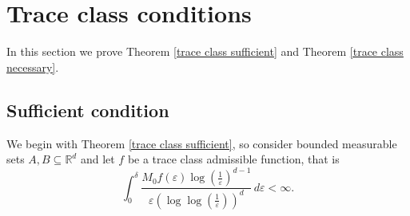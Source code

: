 \documentclass[12pt]{amsart}
\numberwithin{equation}{section}
\newcommand{\R}{\mathbb{R}}
\newcommand{\eps}{\varepsilon}
\begin{document}
\section{Trace class conditions}
In this section we prove Theorem \ref{trace class sufficient} and Theorem \ref{trace class necessary}. 

\subsection{Sufficient condition}
We begin with Theorem \ref{trace class sufficient}, so consider bounded measurable sets $A,B\subseteq \R^d$ and let $f$ be a trace class admissible function, that is
\begin{equation}\label{f condition again}
\int_0^{\delta} \frac{M_0 f(\eps) \log\left(\frac{1}{\eps}\right)^{d-1}}{\eps\left(\log\log\left(\frac{1}{\eps}\right)\right)^d} \, d\eps < \infty.
\end{equation}
\end{document}
